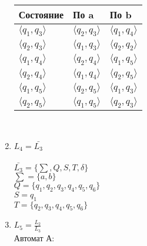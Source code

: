 \documentclass{article}
\begin{document}
\begin{enumerate}
            \begin{tabular} { | l | l | l | }
            \hline 
            Состояние & По a & По b \\ \hline
            \(\langle q_1, q_3\rangle\) & \(\langle q_2, q_3\rangle\) & \(\langle q_1, q_4\rangle\)  \\ \hline
            \(\langle q_2, q_3\rangle\) & \(\langle q_1, q_3\rangle\) & \(\langle q_2, q_2\rangle\) \\ \hline
            \(\langle q_1, q_4\rangle\) & \(\langle q_2, q_4\rangle\) & \(\langle q_1, q_5\rangle\) \\ \hline
            \(\langle q_2, q_4\rangle\) & \(\langle q_1, q_4\rangle\) & \(\langle q_2, q_5\rangle\) \\ \hline
            \(\langle q_1, q_5\rangle\) & \(\langle q_2, q_5\rangle\) & \(\langle q_1, q_3\rangle\) \\ \hline
            \(\langle q_2, q_5\rangle\) & \(\langle q_1, q_5\rangle\) & \(\langle q_2, q_3\rangle\) \\
            \hline
            \end{tabular} \\
            
            \begin{center}
            \end{center}
            
            \item \( L_4 = \bar{L_3}\) \\
            \\
            \(\bar{L_3} = \{ \sum, Q, S, T, \delta  \}\) \\
            \hspace*{-20mm}\(\sum = \{a,b\}\)\\
            \hspace*{-20mm}\(Q = \{q_1,q_2,q_3,q_4,q_5,q_6\}\)\\
            \hspace*{-20mm}\(S = q_1\)\\
            \hspace*{-20mm}\(T = \{q_2,q_3,q_4,q_5,q_6\}\)\\
            
            \begin{center}
            \end{center}
            
            
            \item \( L_5 = \frac{L_2}{L_3}\)  \\ 
            Автомат А:\\
            \begin{center}
            \end{center}
            

\end{enumerate}
\end{document}
